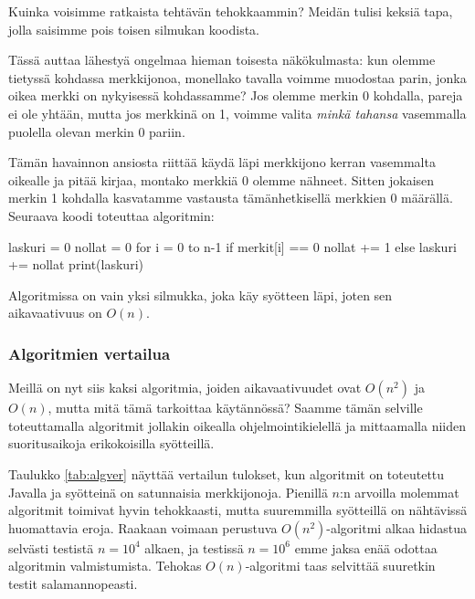 Kuinka voisimme ratkaista tehtävän tehokkaammin?
Meidän tulisi keksiä tapa, jolla saisimme
pois toisen silmukan koodista.

Tässä auttaa lähestyä ongelmaa hieman toisesta
näkökulmasta: kun olemme tietyssä kohdassa merkkijonoa,
monellako tavalla voimme muodostaa parin,
jonka oikea merkki on nykyisessä kohdassamme?
Jos olemme merkin 0 kohdalla, pareja ei ole yhtään,
mutta jos merkkinä on 1, voimme valita \emph{minkä tahansa}
vasemmalla puolella olevan merkin 0 pariin.

Tämän havainnon ansiosta riittää käydä läpi
merkkijono kerran vasemmalta oikealle ja pitää kirjaa,
montako merkkiä 0 olemme nähneet.
Sitten jokaisen merkin 1 kohdalla kasvatamme
vastausta tämänhetkisellä merkkien 0 määrällä.
Seuraava koodi toteuttaa algoritmin:

\begin{code}
    laskuri = 0
    nollat = 0
    for i = 0 to n-1
    if merkit[i] == 0
    nollat += 1
    else
    laskuri += nollat
    print(laskuri)
\end{code}

Algoritmissa on vain yksi silmukka, joka käy syötteen läpi,
joten sen aikavaativuus on $O(n)$.

\subsubsection{Algoritmien vertailua}

Meillä on nyt siis kaksi algoritmia, joiden aikavaativuudet ovat
$O(n^2)$ ja $O(n)$, mutta mitä tämä tarkoittaa käytännössä?
Saamme tämän selville toteuttamalla algoritmit jollakin
oikealla ohjelmointikielellä
ja mittaamalla niiden suoritusaikoja erikokoisilla syötteillä.

Taulukko \ref{tab:algver} näyttää vertailun tulokset,
kun algoritmit on toteutettu Javalla ja syötteinä
on satunnaisia merkkijonoja.
Pienillä $n$:n arvoilla molemmat algoritmit toimivat
hyvin tehokkaasti, mutta suuremmilla syötteillä on
nähtävissä huomattavia eroja.
Raakaan voimaan perustuva $O(n^2)$-algoritmi
alkaa hidastua selvästi testistä $n=10^4$ alkaen,
ja testissä $n=10^6$ emme jaksa enää odottaa algoritmin valmistumista.
Tehokas $O(n)$-algoritmi taas selvittää suuretkin testit
salamannopeasti.

